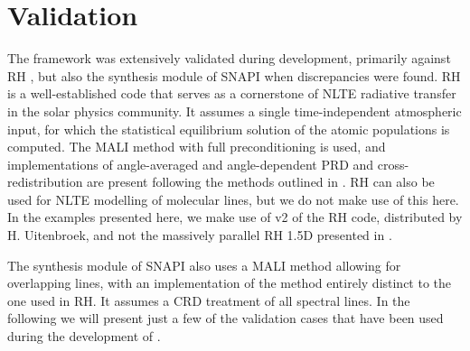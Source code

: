 \section{Validation}\label{Sec:LwValidation}

The \Lw{} framework was extensively validated during development, primarily against RH \citep{Uitenbroek2001}, but also the synthesis module of SNAPI \citep{Milic2018} when discrepancies were found.
RH is a well-established code that serves as a cornerstone of NLTE radiative transfer in the solar physics community.
It assumes a single time-independent atmospheric input, for which the statistical equilibrium solution of the atomic populations is computed.
The MALI method with full preconditioning \citep{Rybicki1992} is used, and implementations of angle-averaged and angle-dependent PRD and cross-redistribution are present following the methods outlined in \citet{Uitenbroek2001,MillerRicci2002}.
RH can also be used for NLTE modelling of molecular lines, but we do not make use of this here.
In the examples presented here, we make use of v2 of the RH code, distributed by H. Uitenbroek, and not the massively parallel RH 1.5D presented in \citet{Pereira2015}.

The synthesis module of SNAPI also uses a MALI method allowing for overlapping lines, with an implementation of the method entirely distinct to the one used in RH.
It assumes a CRD treatment of all spectral lines.
In the following we will present just a few of the validation cases that have been used during the development of \Lw{}.

